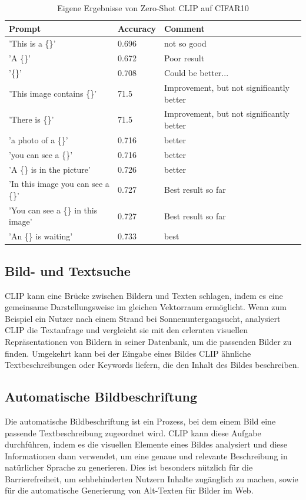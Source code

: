 \documentclass[nolibertine, ngerman, algorithm, nomencl, minted]{ttlab-qualify}
\begin{document}
\begin{table}[h!]
	\centering
	\begin{tabular}{lll}
	  \toprule
	  Prompt & Accuracy & Comment \\
	  \midrule
	  'This is a \{\}' & 0.696 & not so good \\
	  'A \{\}' & 0.672 & Poor result \\
	  '\{\}' & 0.708 & Could be better... \\
	  'This image contains \{\}' & 71.5 & Improvement, but not significantly better \\
	  'There is \{\}' & 71.5 & Improvement, but not significantly better \\
	  'a photo of a \{\}' & 0.716 & better \\
	  'you can see a \{\}' & 0.716 & better \\
	  'A \{\} is in the picture' & 0.726 & better \\
	  'In this image you can see a \{\}' & 0.727 & Best result so far \\
	  'You can see a \{\} in this image' & 0.727 & Best result so far \\
	  'An \{\} is waiting' & 0.733 & best \\
	  \bottomrule
	\end{tabular}
	\caption{Eigene Ergebnisse von Zero-Shot CLIP auf CIFAR10}
  \end{table}

\subsection{Bild- und Textsuche}
CLIP kann eine Brücke zwischen Bildern und Texten schlagen, indem es eine gemeinsame Darstellungsweise im 
gleichen Vektorraum ermöglicht. Wenn zum Beispiel ein Nutzer nach \glqq einem Strand bei Sonnenuntergang\grqq sucht, 
analysiert CLIP die Textanfrage und vergleicht sie mit den erlernten visuellen Repräsentationen von Bildern in 
seiner Datenbank, um die passenden Bilder zu finden. Umgekehrt kann bei der Eingabe eines Bildes CLIP ähnliche 
Textbeschreibungen oder Keywords liefern, die den Inhalt des Bildes beschreiben.

\subsection{Automatische Bildbeschriftung}
Die automatische Bildbeschriftung ist ein Prozess, bei dem einem Bild eine passende Textbeschreibung zugeordnet wird. 
CLIP kann diese Aufgabe durchführen, indem es die visuellen Elemente eines Bildes analysiert und diese Informationen 
dann verwendet, um eine genaue und relevante Beschreibung in natürlicher Sprache zu generieren. Dies ist besonders 
nützlich für die Barrierefreiheit, um sehbehinderten Nutzern Inhalte zugänglich zu machen, sowie für die automatische 
Generierung von Alt-Texten für Bilder im Web.
\end{document}
